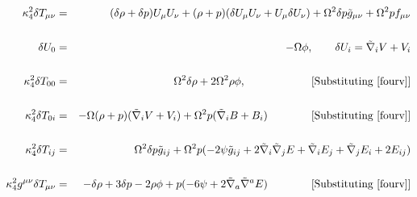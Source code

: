\documentclass[10pt,letterpaper]{article}
\numberwithin{equation}{section}
\begin{document}
\begin{eqnarray}
\\ \nonumber\\ 
\kappa^2_4\delta T_{\mu\nu} &=& (\delta\rho + \delta p) U_\mu U_\nu + (\rho+p)(\delta U_\mu U_\nu + U_\mu \delta U_\nu) + \Omega^2 \delta p \tilde g_{\mu\nu} + \Omega^2 p f_{\mu\nu}
\\ \nonumber\\
\delta U_0 &=& - \Omega \phi,\qquad \delta U_i = \tilde\nabla_i V + V_i
\label{fourv}
\\ \nonumber\\
\kappa^2_4 \delta T_{00}&=& \Omega^2 \delta \rho + 2 \Omega^2 \rho \phi,\qquad\qquad\qquad \text{[Substituting \eqref{fourv}]}
\\  \nonumber\\ 
\kappa^2_4 \delta T_{0i}&=& -\Omega(\rho+p)(\tilde\nabla_i V + V_i) + \Omega^2 p (\tilde\nabla_i B + B_i)
\qquad\qquad \text{[Substituting \eqref{fourv}]}
\\  \nonumber\\ 
\kappa^2_4\delta T_{ij}&=& \Omega^2 \delta p \tilde g_{ij} + \Omega^2 p (-2\psi \tilde g_{ij} + 2\tilde\nabla_i\tilde\nabla_j E + 
\tilde\nabla_i E_j +\tilde\nabla_j E_i + 2E_{ij})
\\ \nonumber\\
\kappa^2_4 g^{\mu\nu}\delta T_{\mu\nu} &=&  - \delta \rho + 3\delta p - 2\rho \phi + p(-6\psi + 2\tilde\nabla_a\tilde\nabla^a E)
\qquad\qquad \text{[Substituting \eqref{fourv}]}
\end{eqnarray}
%
%
%
\end{document}
